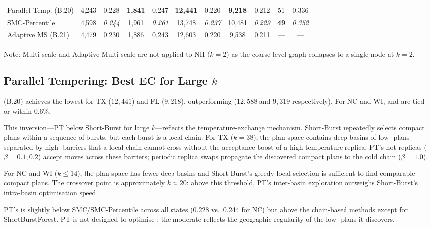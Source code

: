 \begin{table}[ht]
\begin{tabular}{@{}l
  cc cc cc cc cc
  @{}}
\midrule
Parallel Temp. (B.20)   & \dag{}4{,}243 & \dag{}0.228 & \dag{}\textbf{1{,}841} & \dag{}0.247 & \dag{}\textbf{12{,}441} & \dag{}0.220 & \dag{}\textbf{9{,}218} & \dag{}0.212 & \dag{}51 & \dag{}0.336 \\
SMC-Percentile          & \dag{}4{,}598 & \dag{}\textit{0.244} & \dag{}1{,}961 & \dag{}\textit{0.261} & \dag{}13{,}748 & \dag{}\textit{0.237} & \dag{}10{,}481 & \dag{}\textit{0.229} & \dag{}\textbf{49} & \dag{}\textit{0.352} \\
Adaptive MS (B.21)      & \dag{}4{,}479 & \dag{}0.230 & \dag{}1{,}886 & \dag{}0.243 & \dag{}12{,}603 & \dag{}0.220 & \dag{} 9{,}538 & \dag{}0.211 & \dag{}--- & \dag{}--- \\
\bottomrule
\end{tabular}
\end{table}

Note: Multi-scale and Adaptive Multi-scale are not applied to NH ($k = 2$)
as the coarse-level graph collapses to a single node at $k = 2$.

\subsection{Parallel Tempering: Best EC for Large \texorpdfstring{$k$}{k}}

\pt{} (B.20) achieves the lowest \ec{} for TX ($12{,}441$) and FL
($9{,}218$), outperforming \sburst{} ($12{,}588$ and $9{,}319$ respectively).
For NC and WI, \pt{} and \sburst{} are tied or within 0.6\%.

This inversion---PT below Short-Burst for large $k$---reflects the
temperature-exchange mechanism.
Short-Burst repeatedly selects compact plans within a sequence of bursts,
but each burst is a local \recom{} chain.
For TX ($k = 38$), the plan space contains deep basins of low-\ec{}
plans separated by high-\ec{} barriers that a local chain cannot cross
without the acceptance boost of a high-temperature replica.
PT's hot replicas ($\beta = 0.1, 0.2$) accept moves across these barriers;
periodic replica swaps propagate the discovered compact plans to the cold
chain ($\beta = 1.0$).

For NC and WI ($k \leq 14$), the plan space has fewer deep basins and
Short-Burst's greedy local selection is sufficient to find comparable compact
plans.
The crossover point is approximately $k \approx 20$: above this threshold,
PT's inter-basin exploration outweighs Short-Burst's intra-basin optimisation
speed.

PT's \pp{} is slightly below SMC/SMC-Percentile across all states
(0.228 vs.\ 0.244 for NC) but above the chain-based methods except for
ShortBurstForest.
PT is not designed to optimise \pp{}; the moderate \pp{} reflects the
geographic regularity of the low-\ec{} plans it discovers.

